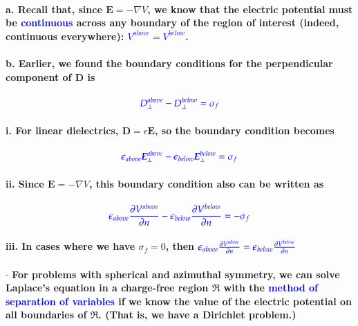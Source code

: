 \documentclass{article}
\begin{document}
\paragraph{\indent a. Recall that, since $\boldsymbol{E}=-\nabla V$, we know that the electric potential must be \textcolor{blue}{continuous} across any boundary of the region of interest (indeed, continuous everywhere): \textcolor{blue}{$V^{above}=V^{below}$}.}
\paragraph{\indent b. Earlier, we found the boundary conditions for the perpendicular component of $\boldsymbol{D}$ is }
\begin{equation*}
    \textcolor{blue}{D_{\perp}^{above}-D_{\perp}^{below}=\sigma_f}
\end{equation*}
\paragraph{\indent\indent i. For linear dielectrics, $\boldsymbol{D}=\epsilon\boldsymbol{E}$, so the boundary condition becomes}
\begin{equation*}
    \textcolor{blue}{\epsilon_{above}\boldsymbol{E}_{\perp}^{above}-\epsilon_{below}\boldsymbol{E}_\perp^{below}=\sigma_f}
\end{equation*}
\paragraph{\indent\indent ii. Since $\boldsymbol{E}=-\nabla V$, this boundary condition also can be written as}
\begin{equation*}
    \textcolor{blue}{\epsilon_{above}\frac{\partial V^{above}}{\partial n}-\epsilon_{below}\frac{\partial V^{below}}{\partial n}=-\sigma_f}
\end{equation*}
\paragraph{\indent\indent iii. In cases where we have $\sigma_f=0$, then $\textcolor{blue}{\epsilon_{above}\frac{\partial V^{above}}{\partial n}=\epsilon_{below}\frac{\partial V^{below}}{\partial n}}$}
\paragraph{$\cdot$ For problems with spherical and azimuthal symmetry, we can solve Laplace's equation in a charge-free region $\mathfrak{R}$ with the \textcolor{blue}{method of separation of variables} if we know the value of the electric potential on all boundaries of $\mathfrak{R}$. (That is, we have a Dirichlet problem.)}
\end{document}
